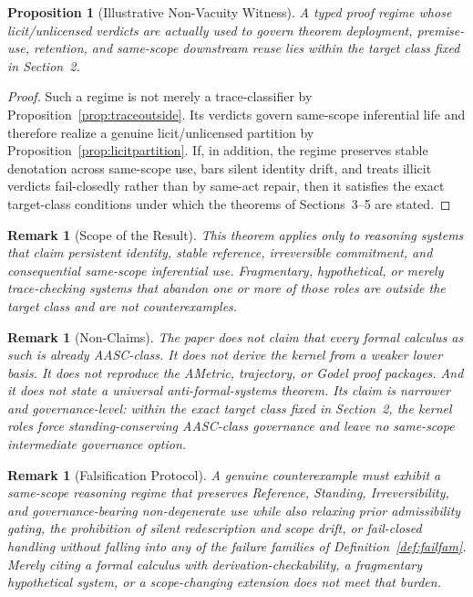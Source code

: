 \documentclass[11pt]{article}
\newtheorem{proposition}[theorem]{Proposition}
\newtheorem{remark}[theorem]{Remark}
\begin{document}
\begin{proposition}[Illustrative Non-Vacuity Witness]
\label{prop:witness}
A typed proof regime whose licit/unlicensed verdicts are actually used to govern theorem deployment, premise-use, retention, and same-scope downstream reuse lies within the target class fixed in Section~2.
\end{proposition}

\begin{proof}
Such a regime is not merely a trace-classifier by Proposition~\ref{prop:traceoutside}. Its verdicts govern same-scope inferential life and therefore realize a genuine licit/unlicensed partition by Proposition~\ref{prop:licitpartition}. If, in addition, the regime preserves stable denotation across same-scope use, bars silent identity drift, and treats illicit verdicts fail-closedly rather than by same-act repair, then it satisfies the exact target-class conditions under which the theorems of Sections~3--5 are stated.
\end{proof}

\begin{remark}[Scope of the Result]
This theorem applies only to reasoning systems that claim persistent identity, stable reference, irreversible commitment, and consequential same-scope inferential use. Fragmentary, hypothetical, or merely trace-checking systems that abandon one or more of those roles are outside the target class and are not counterexamples.
\end{remark}

\begin{remark}[Non-Claims]
The paper does not claim that every formal calculus as such is already AASC-class. It does not derive the kernel from a weaker lower basis. It does not reproduce the AMetric, trajectory, or Godel proof packages. And it does not state a universal anti-formal-systems theorem. Its claim is narrower and governance-level: within the exact target class fixed in Section~2, the kernel roles force standing-conserving AASC-class governance and leave no same-scope intermediate governance option.
\end{remark}

\begin{remark}[Falsification Protocol]
A genuine counterexample must exhibit a same-scope reasoning regime that preserves Reference, Standing, Irreversibility, and governance-bearing non-degenerate use while also relaxing prior admissibility gating, the prohibition of silent redescription and scope drift, or fail-closed handling without falling into any of the failure families of Definition~\ref{def:failfam}. Merely citing a formal calculus with derivation-checkability, a fragmentary hypothetical system, or a scope-changing extension does not meet that burden.
\end{remark}
\end{document}
